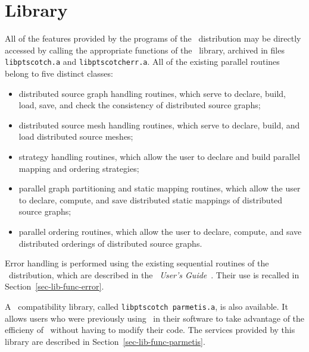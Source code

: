
\section{Library}
\label{sec-lib}

All of the features provided by the programs of the
\ptscotch\ distribution may be directly accessed by calling
the appropriate functions of the \libscotch\ library, archived
in files {\tt libptscotch.a} and {\tt libptscotcherr.a}.
All of the existing parallel routines belong to five distinct classes:
\begin{itemize}
\item
distributed source graph handling routines, which serve to declare,
build, load, save, and check the consistency of distributed source
graphs;
\item
distributed source mesh handling routines, which serve to declare,
build, and load%
distributed source meshes;
\item
strategy handling routines, which allow the user to declare and build
parallel mapping and ordering strategies;
\item
parallel graph partitioning and static mapping routines, which allow
the user to declare, compute, and save distributed static mappings of
distributed source graphs;
\item
parallel ordering routines, which allow the user to declare, compute,
and save distributed orderings of distributed source graphs.
\end{itemize}
Error handling is performed using the existing sequential routines of
the \scotch\ distribution, which are described in the
{\it\scotch\ User's Guide}~\scotchcitesuser. Their use is recalled in
Section~\ref{sec-lib-func-error}.

A \parmetis\ compatibility library, called {\tt lib\lbo ptscotch\lbo
parmetis.a}, is also available. It allows users who were previously
using \parmetis\ in their software to take advantage of the efficieny
of \ptscotch\ without having to modify their code. The services
provided by this library are described in
Section~\ref{sec-lib-func-parmetis}.


